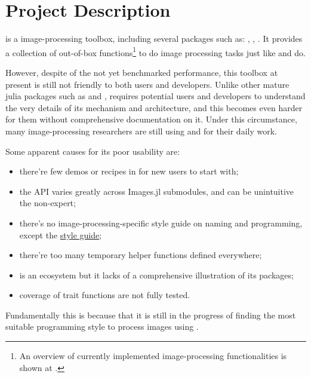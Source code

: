 
\section{Project Description}\label{sec:project}

\repoimages{} is a \langjulia image-processing toolbox, including several packages such as: \repoimagecore, \repoimagetransformations, \repoimageaxes. It provides a collection of out-of-box functions\footnote{An overview of currently implemented image-processing functionalities is shown at \apicomparison.} to do image processing tasks just like \reposcikitimage{} and \matlabimageprocessing{} do.

However, despite of the not yet benchmarked performance, this toolbox at present is still not friendly to both users and developers. Unlike other mature julia packages such as \repojump and \repogpuarrays, \images{} requires potential users and developers to understand the very details of its mechanism and architecture, and this becomes even harder for them without comprehensive documentation on it. Under this circumstance, many image-processing researchers are still using \langpython and \langmatlab for their daily work.

Some apparent causes for its poor usability are:
\begin{itemize}
    \item there're few demos or recipes in \images{} for new users to start with;
    \item the API varies greatly across Images.jl submodules, and can be unintuitive the non-expert;
    \item there's no image-processing-specific style guide on naming and programming, except the \langjulia{} \href{https://docs.julialang.org/en/v1/manual/style-guide/}{style guide};
    \item there're too many temporary helper functions defined everywhere;
    \item \images{} is an ecosystem but it lacks of a comprehensive illustration of its packages;
    \item coverage of trait functions are not fully tested.
\end{itemize}
Fundamentally this is because that it is still in the progress of finding the most suitable programming style to process images using \langjulia.

